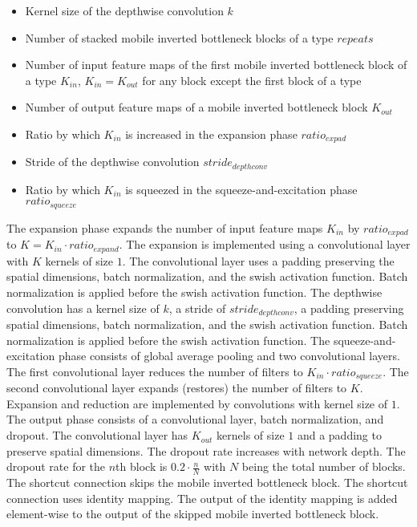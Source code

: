 \begin{itemize}
	\item Kernel size of the depthwise convolution $k$
	\item Number of stacked mobile inverted bottleneck blocks of a type  $repeats$
	\item Number of input feature maps of the first mobile inverted bottleneck block of a type $K_{in}$, $K_{in}=K_{out}$ for any block except the first block of a type
	\item Number of output feature maps of a mobile inverted bottleneck block $K_{out}$
	\item Ratio by which $K_{in}$ is increased in the expansion phase $ratio_{expad}$
	\item Stride of the depthwise convolution $stride_{depthconv}$
	\item Ratio by which $K_{in}$ is squeezed in the squeeze-and-excitation phase $ratio_{squeeze}$
\end{itemize}
The expansion phase expands the number of input feature maps $K_{in}$ by $ratio_{expad}$ to $K =  K_{in} \cdot ratio_{expand}$. The expansion is implemented using a convolutional layer with $K$ kernels of size $1$. The convolutional layer uses a padding preserving the spatial dimensions, batch normalization, and the swish activation function. Batch normalization is applied before the swish activation function.
The depthwise convolution has a kernel size of $k$, a stride of $stride_{depthconv}$, a padding preserving spatial dimensions, batch normalization, and the swish activation function.  Batch normalization is applied before the swish activation function.
The squeeze-and-excitation phase consists of global average pooling and two convolutional layers. The first convolutional layer reduces the number of filters to $K_{in} \cdot ratio_{squeeze}$. The second convolutional layer expands (restores) the number of filters to $K$. Expansion and reduction are implemented by convolutions with kernel size of $1$.
The output phase consists of a convolutional layer, batch normalization, and dropout. The convolutional layer has $K_{out}$ kernels of size $1$ and a padding to preserve spatial dimensions. The dropout rate increases with network depth. The dropout rate for the $n$th block is $0.2 \cdot \frac{n}{N}$ with $N$ being the total number of blocks. 
The shortcut connection skips the mobile inverted bottleneck block. The shortcut connection uses identity mapping. The output of the identity mapping is added element-wise to the output of the skipped mobile inverted bottleneck block. 
